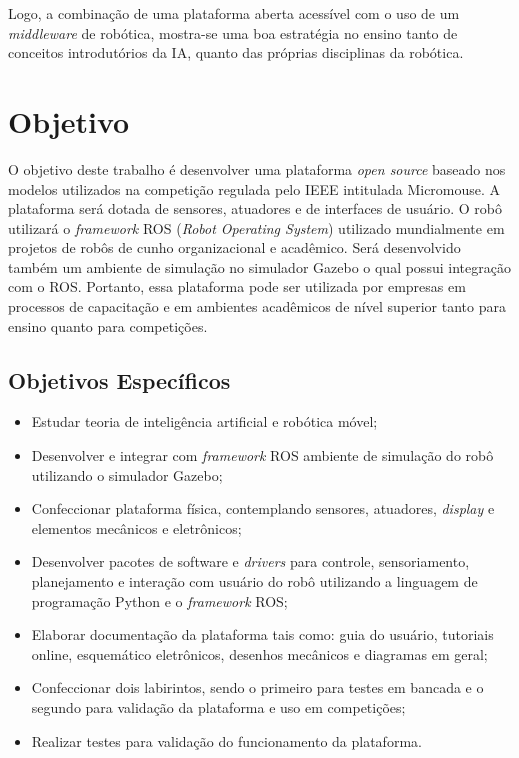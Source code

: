 Logo, a combinação de uma plataforma aberta acessível com o uso de um \textit{middleware} de robótica, mostra-se uma boa estratégia no ensino tanto de conceitos introdutórios da IA, quanto das próprias disciplinas da robótica.


\section{Objetivo}
\label{sec:objetivo_geral}
O objetivo deste trabalho é desenvolver uma plataforma \textit{open source} baseado nos modelos utilizados na competição regulada pelo IEEE intitulada Micromouse. A plataforma será dotada de sensores, atuadores e de interfaces de usuário. O robô utilizará o \textit{framework} ROS (\textit{Robot Operating System}) utilizado mundialmente em projetos de robôs de cunho organizacional e acadêmico. Será desenvolvido também um ambiente de simulação no simulador Gazebo o qual possui integração com o ROS. Portanto, essa plataforma pode ser utilizada por empresas em processos de capacitação e em ambientes acadêmicos de nível superior tanto para ensino quanto para competições.

\subsection{Objetivos Específicos}
\label{ssec:objesp}
\begin{itemize}
	\item Estudar teoria de inteligência artificial e robótica móvel;
	\item Desenvolver e integrar com \textit{framework} ROS ambiente de simulação do robô utilizando o simulador Gazebo;
	\item Confeccionar plataforma física, contemplando sensores, atuadores, \textit{display} e elementos mecânicos e eletrônicos;
	\item Desenvolver pacotes de software e \textit{drivers} para controle, sensoriamento, planejamento e interação com usuário do robô utilizando a linguagem de programação Python e o \textit{framework} ROS;
	\item Elaborar documentação da plataforma tais como: guia do usuário, tutoriais online, esquemático eletrônicos, desenhos mecânicos e diagramas em geral;
	\item Confeccionar dois labirintos, sendo o primeiro para testes em bancada e o segundo para validação da plataforma e uso em competições;
	\item Realizar testes para validação do funcionamento da plataforma. 
	
\end{itemize}


